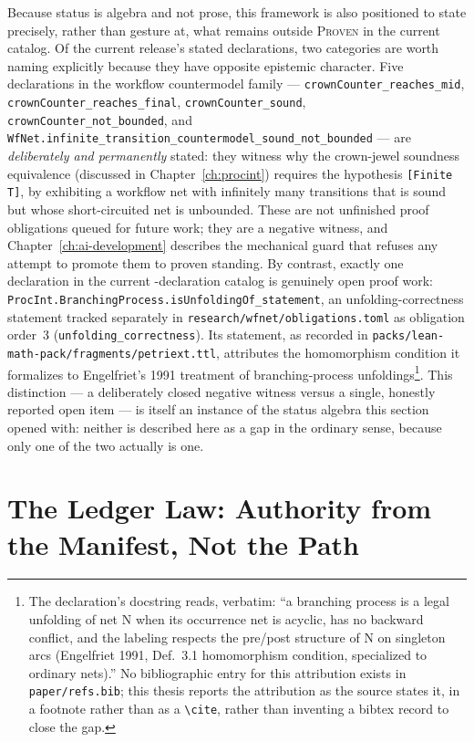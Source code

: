 Because status is algebra and not prose, this framework is also
positioned to state precisely, rather than gesture at, what remains
outside \textsc{Proven} in the current catalog. Of the current release's
\StatedCount{} stated declarations, two categories are worth naming
explicitly because they have opposite epistemic character. Five
declarations in the workflow countermodel family ---
\texttt{crownCounter\_reaches\_mid}, \texttt{crownCounter\_reaches\_final},
\texttt{crownCounter\_sound}, \texttt{crownCounter\_not\_bounded}, and
\texttt{WfNet.infinite\_transition\_countermodel\_sound\_not\_bounded} ---
are \emph{deliberately and permanently} stated: they witness why the
crown-jewel soundness equivalence (discussed in
Chapter~\ref{ch:procint}) requires the hypothesis \texttt{[Finite T]},
by exhibiting a workflow net with infinitely many transitions that is
sound but whose short-circuited net is unbounded. These are not
unfinished proof obligations queued for future work; they are a negative
witness, and Chapter~\ref{ch:ai-development} describes the mechanical
guard that refuses any attempt to promote them to proven standing. By
contrast, exactly one declaration in the current \TotalDecls-declaration
catalog is genuinely open proof work:
\texttt{ProcInt.BranchingProcess.isUnfoldingOf\_statement}, an
unfolding-correctness statement tracked separately in
\texttt{research/wfnet/obligations.toml} as obligation order~3
(\texttt{unfolding\_correctness}). Its statement, as recorded in
\texttt{packs/lean-math-pack/fragments/petriext.ttl}, attributes the
homomorphism condition it formalizes to Engelfriet's 1991 treatment of
branching-process unfoldings\footnote{The declaration's docstring reads,
verbatim: ``a branching process is a legal unfolding of net N when its
occurrence net is acyclic, has no backward conflict, and the labeling
respects the pre/post structure of N on singleton arcs (Engelfriet 1991,
Def.~3.1 homomorphism condition, specialized to ordinary nets).'' No
bibliographic entry for this attribution exists in \texttt{paper/refs.bib};
this thesis reports the attribution as the source states it, in a
footnote rather than as a \texttt{\textbackslash cite}, rather than
inventing a bibtex record to close the gap.}. This distinction --- a
deliberately closed negative witness versus a single, honestly reported
open item --- is itself an instance of the status algebra this section
opened with: neither is described here as a gap in the ordinary sense,
because only one of the two actually is one.

\section{The Ledger Law: Authority from the Manifest, Not the Path}
\label{sec:mfact-ledger}

